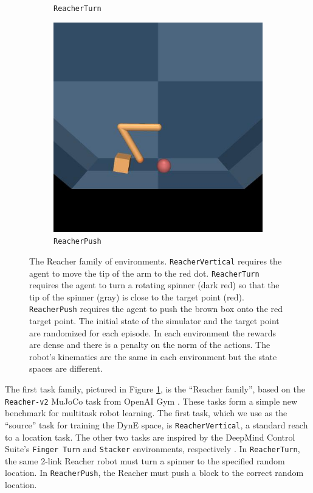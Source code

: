\begin{figure}[h]
\begin{subfigure}[t]{0.3\textwidth}
    \caption{\texttt{ReacherTurn}}
\end{subfigure}
\begin{subfigure}[t]{0.3\textwidth}
    \includegraphics[width=\textwidth]{figures/dyne/ReacherPush.jpg}
    \caption{\texttt{ReacherPush}}
\end{subfigure}
\caption{The Reacher family of environments. \texttt{ReacherVertical} requires the agent to move the tip of the arm to the red dot. \texttt{ReacherTurn} requires the agent to turn a rotating spinner (dark red) so that the tip of the spinner (gray) is close to the target point (red). \texttt{ReacherPush} requires the agent to push the brown box onto the red target point. The initial state of the simulator and the target point are randomized for each episode. In each environment the rewards are dense and there is a penalty on the norm of the actions. The robot's kinematics are the same in each environment but the state spaces are different.}
\label{fig:reacher_family}
\end{figure}

The first task family, pictured in Figure \ref{fig:reacher_family}, is the ``Reacher family'', based on the \texttt{Reacher-v2} MuJoCo \citep{todorov2012mujoco} task from OpenAI Gym \citep{brockman2016openai}.
These tasks form a simple new benchmark for multitask robot learning.
The first task, which we use as the ``source'' task for training the DynE space, is \texttt{ReacherVertical}, a standard reach to a location task.
The other two tasks are inspired by the DeepMind Control Suite's \texttt{Finger Turn} and \texttt{Stacker} environments, respectively \citep{tassa2018deepmind}.
In \texttt{ReacherTurn}, the same 2-link Reacher robot must turn a spinner to the specified random location.
In \texttt{ReacherPush}, the Reacher must push a block to the correct random location.


